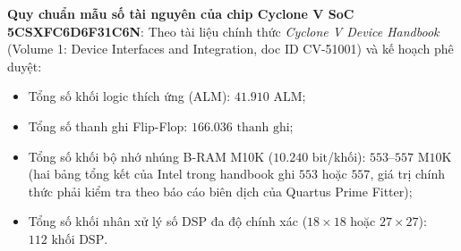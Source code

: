 \textbf{Quy chuẩn mẫu số tài nguyên của chip Cyclone V SoC 5CSXFC6D6F31C6N}:
Theo tài liệu chính thức \emph{Cyclone V Device Handbook} (Volume 1: Device Interfaces and Integration, doc ID CV-51001) và kế hoạch phê duyệt:
\begin{itemize}
    \item Tổng số khối logic thích ứng (ALM): $41.910\text{ ALM}$;
    \item Tổng số thanh ghi Flip-Flop: $166.036\text{ thanh ghi}$;
    \item Tổng số khối bộ nhớ nhúng B-RAM M10K ($10.240\text{ bit}$/khối): $553$--$557\text{ M10K}$ (hai bảng tổng kết của Intel trong handbook ghi $553$ hoặc $557$, giá trị chính thức phải kiểm tra theo báo cáo biên dịch của Quartus Prime Fitter);
    \item Tổng số khối nhân xử lý số DSP đa độ chính xác ($18 \times 18$ hoặc $27 \times 27$): $112\text{ khối DSP}$.
\end{itemize}

